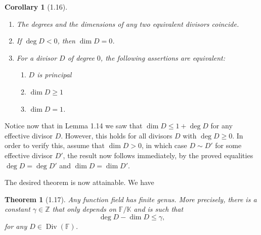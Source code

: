 \documentclass[11pt]{article}
\theoremstyle{scplain}
\newtheorem*{corollary}{Corollary}
\newtheorem*{theorem}{Theorem}
\DeclareMathOperator{\Div}{Div}
\begin{document}
\begin{corollary}[1.16]
\begin{enumerate}
\item[(a)] The degrees and the dimensions of any two equivalent divisors
coincide.

\item[(b)] If $\deg D < 0$, then $\dim D = 0$.

\item[(c)] For a divisor $D$ of degree $0$, the following assertions are
equivalent:
  \begin{enumerate}
  \item[(i)] $D$ is principal
  \item[(ii)] $\dim D \geq 1$
  \item[(iii)] $\dim D = 1$.
  \end{enumerate}
\end{enumerate}
\end{corollary}

Notice now that in Lemma 1.14 we saw that $\dim D \leq 1 + \deg D$ for any
effective divisor $D$. However, this holds for all divisors $D$ with
$\deg D \geq 0$. In order to verify this, assume that $\dim D > 0$, in which
case $D \sim D'$ for some effective divisor $D'$, the result now follows
immediately, by the proved equalities $\deg D = \deg D'$ and
$\dim D = \dim D'$.

The desired theorem is now attainable. We have

\begin{theorem}[1.17]
Any function field has finite genus. More precisely, there is a constant
$\gamma \in \mathbb{Z}$ that only depends on $\mathbb{F}/\mathbb{K}$ and is such
that
\[
  \deg D - \dim D \leq \gamma,
\]
for any $D \in \Div(\mathbb{F})$.
\end{theorem}
\end{document}

